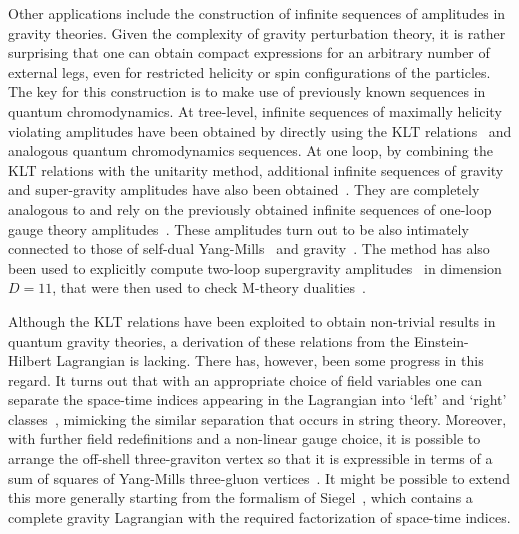 Other applications include the construction of infinite sequences of
amplitudes in gravity theories.  Given the complexity of gravity
perturbation theory, it is rather surprising that one can obtain
compact expressions for an arbitrary number of external legs, even 
for restricted helicity or spin configurations of the particles.  The
key for this construction is to make use of previously known sequences
in quantum chromodynamics. At tree-level, infinite sequences of
maximally helicity violating amplitudes have been obtained by directly
using the KLT relations~\cite{BGK,Square} and analogous quantum
chromodynamics sequences.  At one loop, by combining the KLT relations
with the unitarity method, additional infinite sequences of gravity
and super-gravity amplitudes have also been
obtained~\cite{AllPlusGrav,MHVGrav}.  They are completely analogous to
and rely on the previously obtained infinite sequences of one-loop
gauge theory
amplitudes~\cite{AllPlusGauge,Bern94SusyFour,Bern95SusyFour}.  These
amplitudes turn out to be also intimately connected to those of
self-dual
Yang-Mills~\cite{Yang77,DuffIsham80,Lenzov87,Lenzov88,Bardeen96,
Cangemi,ChalmersSiegel} and
gravity~\cite{Plebanski75,Duff79,Plebanski96}.  The method has also
been used to explicitly compute two-loop supergravity
amplitudes~\cite{BDDPR} in dimension $D=11$, that were then used to
check M-theory dualities~\cite{GreenTwoLoop}.

Although the KLT relations have been exploited to obtain non-trivial
results in quantum gravity theories, a derivation of these relations
from the Einstein-Hilbert Lagrangian is lacking.  There has, however,
been some progress in this regard.  It turns out that with an
appropriate choice of field variables one can separate the space-time
indices appearing in the Lagrangian into `left' and `right'
classes~\cite{Siegel93A,Siegel93B,Siegel94,BernGrant}, mimicking the similar
separation that occurs in string theory.  Moreover, with further field
redefinitions and a non-linear gauge choice, it is possible to arrange
the off-shell three-graviton vertex so that it is expressible in terms
of a sum of squares of Yang-Mills three-gluon
vertices~\cite{BernGrant}.  It might be possible to extend this 
more generally starting from the formalism of
Siegel~\cite{Siegel93A,Siegel93B,Siegel94}, which contains a complete gravity
Lagrangian with the required factorization of space-time indices.

